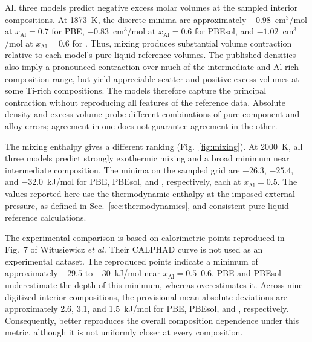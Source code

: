 All three models predict negative excess molar volumes at the sampled interior compositions.
At 1873~K, the discrete minima are approximately $-0.98$~cm$^3$/mol at $x_{\mathrm{Al}}=0.7$ for PBE, $-0.83$~cm$^3$/mol at $x_{\mathrm{Al}}=0.6$ for PBEsol, and $-1.02$~cm$^3$/mol at $x_{\mathrm{Al}}=0.6$ for \rscan{}.
Thus, mixing produces substantial volume contraction relative to each model's pure-liquid reference volumes.
The published densities also imply a pronounced contraction over much of the intermediate and Al-rich composition range, but yield appreciable scatter and positive excess volumes at some Ti-rich compositions.
The models therefore capture the principal contraction without reproducing all features of the reference data.
Absolute density and excess volume probe different combinations of pure-component and alloy errors; agreement in one does not guarantee agreement in the other.


The mixing enthalpy gives a different ranking (Fig.~\ref{fig:mixing}).
At 2000~K, all three models predict strongly exothermic mixing and a broad minimum near intermediate composition.
The minima on the sampled grid are $-26.3$, $-25.4$, and $-32.0$~kJ/mol for PBE, PBEsol, and \rscan{}, respectively, each at $x_{\mathrm{Al}}=0.5$.
The values reported here use the thermodynamic enthalpy at the imposed external pressure, as defined in Sec.~\ref{sec:thermodynamics}, and consistent pure-liquid reference calculations.

The experimental comparison is based on calorimetric points reproduced in Fig.~7 of Witusiewicz \textit{et al.}\cite{Witusiewicz2008}
Their CALPHAD curve is not used as an experimental dataset.
The reproduced points indicate a minimum of approximately $-29.5$ to $-30$~kJ/mol near $x_{\mathrm{Al}}=0.5$--0.6.
PBE and PBEsol underestimate the depth of this minimum, whereas \rscan{} overestimates it.
Across nine digitized interior compositions, the provisional mean absolute deviations are approximately 2.6, 3.1, and 1.5~kJ/mol for PBE, PBEsol, and \rscan{}, respectively.
Consequently, \rscan{} better reproduces the overall composition dependence under this metric, although it is not uniformly closer at every composition.

